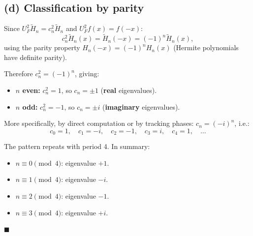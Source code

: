 \documentclass[12pt]{article}
\begin{document}
\subsection*{(d) Classification by parity}

Since $U_F^2 \tilde{H}_n = c_n^2 \tilde{H}_n$ and $U_F^2 f(x) = f(-x)$:
\[
c_n^2 \tilde{H}_n(x) = \tilde{H}_n(-x) = (-1)^n \tilde{H}_n(x),
\]
using the parity property $H_n(-x) = (-1)^n H_n(x)$ (Hermite polynomials have definite parity).

Therefore $c_n^2 = (-1)^n$, giving:
\begin{itemize}
\item \textbf{$n$ even:} $c_n^2 = 1$, so $c_n = \pm 1$ (\textbf{real} eigenvalues).
\item \textbf{$n$ odd:} $c_n^2 = -1$, so $c_n = \pm i$ (\textbf{imaginary} eigenvalues).
\end{itemize}

More specifically, by direct computation or by tracking phases: $c_n = (-i)^n$, i.e.:
\[
c_0 = 1, \quad c_1 = -i, \quad c_2 = -1, \quad c_3 = i, \quad c_4 = 1, \quad \ldots
\]

The pattern repeats with period 4. In summary:
\begin{itemize}
\item $n \equiv 0 \pmod{4}$: eigenvalue $+1$.
\item $n \equiv 1 \pmod{4}$: eigenvalue $-i$.
\item $n \equiv 2 \pmod{4}$: eigenvalue $-1$.
\item $n \equiv 3 \pmod{4}$: eigenvalue $+i$.
\end{itemize}

\hfill $\blacksquare$
\end{document}
